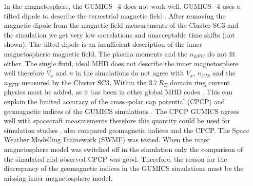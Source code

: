 \documentclass[draft]{agujournal2019}
\begin{document}
In the magnetosphere, the GUMICS$-$4 does not work well. GUMICS$-$4 uses a tilted dipole to describe the terrestrial magnetic field \cite{janhunen12:_gumic_mhd}. After removing the magnetic dipole from the magnetic field measurements of the Cluster SC3 and the simulation we get very low correlations and unacceptable time shifts (not shown). The tilted dipole is an insufficient description of the inner magnetospheric magnetic field. The plasma moments and the $n_{EFW}$ do not fit either. The single fluid, ideal MHD does not describe the inner magnetosphere well therefore $V_{x}$ and $n$ in the simulations do not agree with $V_{x}$, $n_{CIS}$ and the $n_{EFW}$ measured by the Cluster SC3. Within the $3.7\,R_{E}$ domain ring current physics must be added, as it has been in other global MHD codes \cite<for example>[]{toth12:_adapt}. This can explain the limited accuracy of the cross--polar cap potential (CPCP) and geomagnetic indices of the GUMICS simulations \cite{juusola14:_statis_gumic_mhd}. The CPCP GUMICS agrees well with spacecraft measurements therefore this quantity could be used for simulation studies \cite{lakka18:_cross_polar_cap_satur_gumic}.  also compared geomagnetic indices and the CPCP. The Space Weather Modelling Framework (SWMF) was tested. When the inner magnetosphere model was switched off in the simulation only the comparison of the simulated and observed CPCP was good. Therefore, the reason for the discrepancy of the geomagnetic indices in the GUMICS simulations must be the missing inner magnetosphere model.
\end{document}
